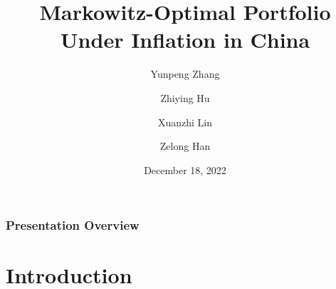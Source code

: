\documentclass[
	11pt, %
]{beamer}
\title[Digital Tools for Finance]{Markowitz-Optimal Portfolio \\ Under Inflation in China} %
\subtitle{} %
\author[Zhang, Hu, Lin, Han]{Yunpeng Zhang\and Zhiying Hu\and Xuanzhi Lin\and Zelong Han} %
\institute{University of Zurich} %
\date[December 18, 2022]{December 18, 2022} %
\begin{document}

\begin{frame}
	\titlepage %
\end{frame}



\begin{frame}
	\frametitle{Presentation Overview} %
	
	\tableofcontents %
\end{frame}

\section{Introduction} %
\end{document}
